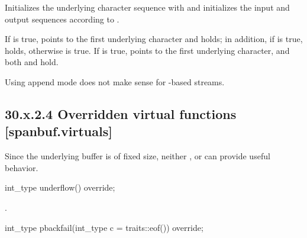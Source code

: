 \documentclass[ebook,11pt,article]{memoir}
\begin{document}
\begin{itemdescr}
\pnum
\effects
Initializes the  underlying character
sequence with  and initializes the input and output sequences according to .

\pnum
\postconditions If  is true,  points to the
first underlying character and  holds; in
addition, if  is true,
holds, otherwise  is true. If  is
true,  points to the first underlying character, and both  and  hold.

\begin{note}
Using append mode does not make sense for -based streams.
\end{note}

\end{itemdescr}

\subsection{30.x.2.4 Overridden virtual functions [spanbuf.virtuals]}
\pnum
\begin{note}
Since the underlying buffer is of fixed size, neither ,  or  can provide useful behavior.
\end{note}

\begin{itemdecl}
int_type underflow() override;
\end{itemdecl}

\begin{itemdescr}
\pnum
\returns
.
\end{itemdescr}

\begin{itemdecl}
int_type pbackfail(int_type c = traits::eof()) override;
\end{itemdecl}
\end{document}
